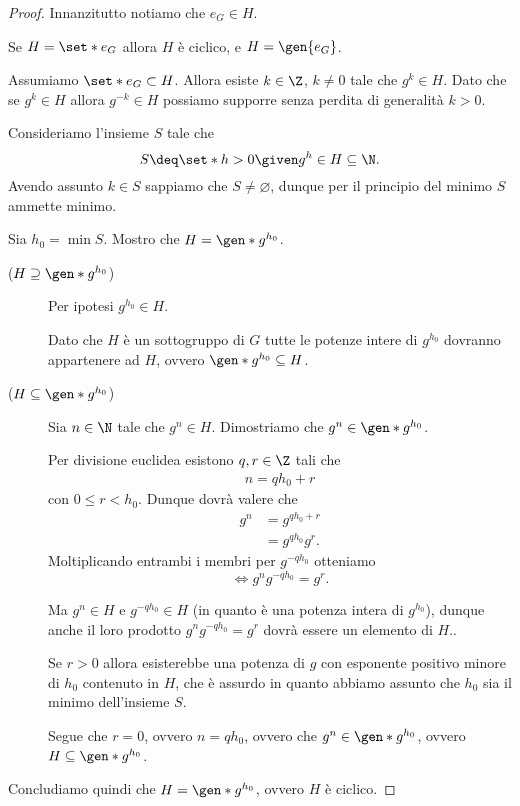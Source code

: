 \begin{proof}
    Innanzitutto notiamo che $e_G \in H$. 
    
    Se $H = \set*{e_G}$ allora $H$ è ciclico, e $H = \gen{e_G}$.

    Assumiamo $\set*{e_G} \subset H$. Allora esiste $k \in \Z$, $k \neq 0$ tale che $g^k \in H$. 
    Dato che se $g^k \in H$ allora $g^{-k} \in H$ possiamo supporre senza perdita di generalità $k > 0$.

    Consideriamo l'insieme $S$ tale che \[
        S \deq \set*{h > 0 \given g^h \in H} \subseteq \N.    
    \] Avendo assunto $k \in S$ sappiamo che $S \neq \varnothing$, dunque per il principio del minimo $S$ ammette minimo.

    Sia $h_0 = \min S$. Mostro che $H = \gen*{g^{h_0}}$.
    \begin{description}
        \item[($H \supseteq \gen*{g^{h_0}}$)] Per ipotesi $g^{h_0} \in H$. 
        
        Dato che $H$ è un sottogruppo di $G$ tutte le potenze intere di $g^{h_0}$ dovranno appartenere ad $H$, ovvero $\gen*{g^{h_0}} \subseteq H$.
        \item[($H \subseteq \gen*{g^{h_0}}$)] Sia $n \in \N$ tale che $g^n \in H$. Dimostriamo che $g^n \in \gen*{g^{h_0}}$.
        
        Per divisione euclidea esistono $q, r \in \Z$ tali che \begin{align*}
            n = qh_0 + r
        \end{align*} con $0 \leq r < h_0$.
        Dunque dovrà valere che\begin{align*}
            g^n &= g^{qh_0 + r}\\
                &= g^{qh_0}g^r.
        \end{align*}
        Moltiplicando entrambi i membri per $g^{-qh_0}$ otteniamo \[
            \iff g^ng^{-qh_0} = g^r.
        \]

        Ma $g^n \in H$ e $g^{-qh_0} \in H$ (in quanto è una potenza intera di $g^{h_0}$), dunque anche il loro prodotto $g^ng^{-qh_0} = g^r$ dovrà essere un elemento di $H$..

        Se $r > 0$ allora esisterebbe una potenza di $g$ con esponente positivo minore di $h_0$ contenuto in $H$, che è assurdo in quanto abbiamo assunto che $h_0$ sia il minimo dell'insieme $S$.
        
        Segue che $r = 0$, ovvero $n = qh_0$, ovvero che $g^n \in \gen*{g^{h_0}}$, ovvero $H \subseteq \gen*{g^{h_0}}$.
    \end{description}

    Concludiamo quindi che $H = \gen*{g^{h_0}}$, ovvero $H$ è ciclico.
\end{proof}

